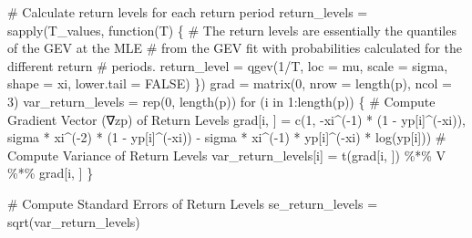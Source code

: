 \documentclass[
  letterpaper,
  DIV=11,
  numbers=noendperiod]{scrartcl}
\newenvironment{Shaded}{\begin{snugshade}}{\end{snugshade}}
\newcommand{\AttributeTok}[1]{\textcolor[rgb]{0.40,0.45,0.13}{#1}}
\newcommand{\CommentTok}[1]{\textcolor[rgb]{0.37,0.37,0.37}{#1}}
\newcommand{\ConstantTok}[1]{\textcolor[rgb]{0.56,0.35,0.01}{#1}}
\newcommand{\ControlFlowTok}[1]{\textcolor[rgb]{0.00,0.23,0.31}{#1}}
\newcommand{\DecValTok}[1]{\textcolor[rgb]{0.68,0.00,0.00}{#1}}
\newcommand{\FunctionTok}[1]{\textcolor[rgb]{0.28,0.35,0.67}{#1}}
\newcommand{\NormalTok}[1]{\textcolor[rgb]{0.00,0.23,0.31}{#1}}
\newcommand{\OtherTok}[1]{\textcolor[rgb]{0.00,0.23,0.31}{#1}}
\newcommand{\SpecialCharTok}[1]{\textcolor[rgb]{0.37,0.37,0.37}{#1}}
\begin{document}
\begin{Shaded}
\begin{Highlighting}[]
\CommentTok{\# Calculate return levels for each return period}
\NormalTok{return\_levels }\OtherTok{=} \FunctionTok{sapply}\NormalTok{(T\_values, }\ControlFlowTok{function}\NormalTok{(T) \{}
    \CommentTok{\# The return levels are essentially the quantiles of the GEV at the MLE}
    \CommentTok{\# from the GEV fit with probabilities calculated for the different return}
    \CommentTok{\# periods.}
\NormalTok{    return\_level }\OtherTok{=} \FunctionTok{qgev}\NormalTok{(}\DecValTok{1}\SpecialCharTok{/}\NormalTok{T, }\AttributeTok{loc =}\NormalTok{ mu, }\AttributeTok{scale =}\NormalTok{ sigma, }\AttributeTok{shape =}\NormalTok{ xi, }\AttributeTok{lower.tail =} \ConstantTok{FALSE}\NormalTok{)}
\NormalTok{\})}
\NormalTok{grad }\OtherTok{=} \FunctionTok{matrix}\NormalTok{(}\DecValTok{0}\NormalTok{, }\AttributeTok{nrow =} \FunctionTok{length}\NormalTok{(p), }\AttributeTok{ncol =} \DecValTok{3}\NormalTok{)}
\NormalTok{var\_return\_levels }\OtherTok{=} \FunctionTok{rep}\NormalTok{(}\DecValTok{0}\NormalTok{, }\FunctionTok{length}\NormalTok{(p))}
\ControlFlowTok{for}\NormalTok{ (i }\ControlFlowTok{in} \DecValTok{1}\SpecialCharTok{:}\FunctionTok{length}\NormalTok{(p)) \{}
    \CommentTok{\# Compute Gradient Vector (∇zp) of Return Levels}
\NormalTok{    grad[i, ] }\OtherTok{=} \FunctionTok{c}\NormalTok{(}\DecValTok{1}\NormalTok{, }\SpecialCharTok{{-}}\NormalTok{xi}\SpecialCharTok{\^{}}\NormalTok{(}\SpecialCharTok{{-}}\DecValTok{1}\NormalTok{) }\SpecialCharTok{*}\NormalTok{ (}\DecValTok{1} \SpecialCharTok{{-}}\NormalTok{ yp[i]}\SpecialCharTok{\^{}}\NormalTok{(}\SpecialCharTok{{-}}\NormalTok{xi)), sigma }\SpecialCharTok{*}\NormalTok{ xi}\SpecialCharTok{\^{}}\NormalTok{(}\SpecialCharTok{{-}}\DecValTok{2}\NormalTok{) }\SpecialCharTok{*}\NormalTok{ (}\DecValTok{1} \SpecialCharTok{{-}}\NormalTok{ yp[i]}\SpecialCharTok{\^{}}\NormalTok{(}\SpecialCharTok{{-}}\NormalTok{xi)) }\SpecialCharTok{{-}}
\NormalTok{        sigma }\SpecialCharTok{*}\NormalTok{ xi}\SpecialCharTok{\^{}}\NormalTok{(}\SpecialCharTok{{-}}\DecValTok{1}\NormalTok{) }\SpecialCharTok{*}\NormalTok{ yp[i]}\SpecialCharTok{\^{}}\NormalTok{(}\SpecialCharTok{{-}}\NormalTok{xi) }\SpecialCharTok{*} \FunctionTok{log}\NormalTok{(yp[i]))}
    \CommentTok{\# Compute Variance of Return Levels}
\NormalTok{    var\_return\_levels[i] }\OtherTok{=} \FunctionTok{t}\NormalTok{(grad[i, ]) }\SpecialCharTok{\%*\%}\NormalTok{ V }\SpecialCharTok{\%*\%}\NormalTok{ grad[i, ]}
\NormalTok{\}}

\CommentTok{\# Compute Standard Errors of Return Levels}
\NormalTok{se\_return\_levels }\OtherTok{=} \FunctionTok{sqrt}\NormalTok{(var\_return\_levels)}


\end{Highlighting}
\end{Shaded}
\end{document}
